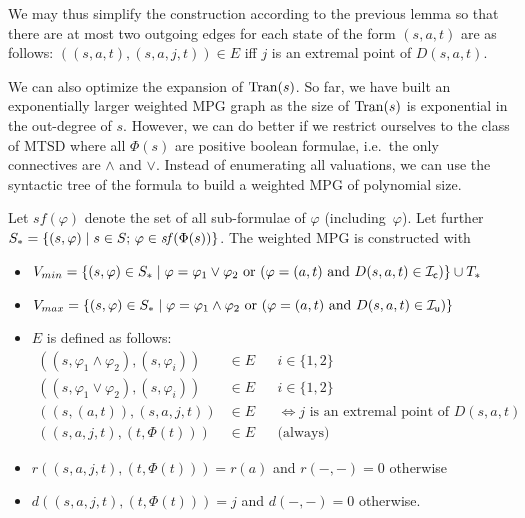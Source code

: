 We may thus simplify the construction according to the previous lemma so
that there are at most two outgoing edges for each state of the form 
$(s,a,t)$ are as follows:
$((s,a,t),(s,a,j,t)) \in E$ iff $j$ is an extremal point of $D(s,a,t)$.








We can also optimize the expansion of $\mathrm{Tran}(s)$. So far, we have
built an exponentially larger weighted MPG graph as the size of $\mathrm{Tran}(s)$ is exponential in the out-degree of $s$. 
However, we can do better if we
restrict ourselves to the class of MTSD where all $\Phi(s)$ are
positive boolean formulae, i.e.~the only connectives are $\wedge$ and $\vee$.  
Instead of enumerating all valuations, we
can use the syntactic tree of the formula to build a 
weighted MPG of polynomial size.

Let $\mathit{sf}(\varphi)$ denote the set of all sub-formulae of $\varphi$
(including~$\varphi$).
Let further $S_* = \{ (s, \varphi) \mid s \in S;\, \varphi \in \mathit{sf}(\Phi(s)) \}$.
The weighted MPG is constructed with 
\begin{itemize}
\item $V_{min} = \{ (s,\varphi) \in S_*\mid \varphi = \varphi_1 \vee \varphi_2 \text{ or }
	(\varphi = (a,t) \text{ and } D(s,a,t) \in \mathcal I_\mathsf c) \} \cup T_*$
\item $V_{max} = \{ (s,\varphi) \in S_*\mid \varphi = \varphi_1 \wedge \varphi_2 \text{ or }
	(\varphi = (a,t) \text{ and } D(s,a,t) \in \mathcal I_\mathsf u) \}$
\item $E$ is defined as follows:
\begin{align*}
((s,\varphi_1 \wedge \varphi_2),(s,\varphi_i)) &\in E &&i\in\{1,2\}\\
((s,\varphi_1 \vee \varphi_2),(s,\varphi_i)) &\in E &&i\in\{1,2\}\\
((s,(a,t)),(s,a,j,t)) &\in E &&\iff j \text{ is an extremal point of }
	D(s,a,t)\\
((s,a,j,t),(t,\Phi(t))) &\in E &&\text{(always)}
\end{align*}
\item $r((s,a,j,t),(t,\Phi(t))) = r(a)$ and $r(-,-) = 0$ otherwise
\item $d((s,a,j,t),(t,\Phi(t))) = j$ and $d(-,-) = 0$ otherwise.
\end{itemize}


